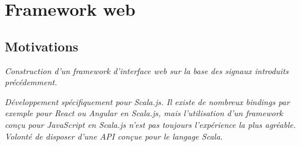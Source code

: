 \chapter{Framework web}

\section{Motivations}
\textit{Construction d'un framework d'interface web sur la base des signaux introduits précédemment.}

\textit{Développement spécifiquement pour Scala.js. Il existe de nombreux bindings par exemple pour React ou Angular en Scala.js, mais l'utilisation d'un framework conçu pour JavaScript en Scala.js n'est pas toujours l'expérience la plus agréable. Volonté de disposer d'une API conçue pour le langage Scala.}



